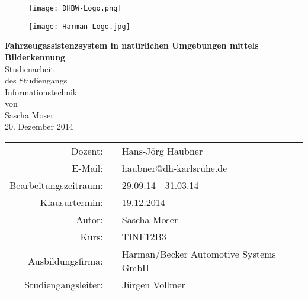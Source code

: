 \begin{titlepage}

  \onehalfspacing
  \begin{figure}[htbp]
    \begin{minipage}{0.4\textwidth}
     \centering
      \texttt{[image: DHBW-Logo.png]}
    \end{minipage}\hfill
    \begin{minipage}{0.4\textwidth}
     \centering
      \texttt{[image: Harman-Logo.jpg]}
    \end{minipage}
  \end{figure}

  \begin{center}	
	\vspace*{2,5cm}
    \huge
	\textbf{Fahrzeugassistenzsystem in natürlichen Umgebungen mittels Bilderkennung\\}
	\vspace*{2cm}
    \Large Studienarbeit\\
    \vspace*{0,5cm}
    \normalsize des Studiengangs\\
    \Large Informationstechnik\\
    \vspace*{0,75cm}
    \normalsize von\\
    \Large Sascha Moser\\
    \vspace*{0,75cm}
    \large 20. Dezember 2014\\
    \vspace*{1,8cm}
    \small
    \renewcommand{\arraystretch}{1,2}
    \singlespacing
    \begin{tabular}{rcl}
    	\hline
  		Dozent: & & Hans-Jörg Haubner\\
  		E-Mail: & & haubner@dh-karlsruhe.de\\
  		Bearbeitungszeitraum: & \hspace*{0,5mm} & 29.09.14 - 31.03.14 \\
  		Klausurtermin: & & 19.12.2014\\
  		Autor: & & Sascha Moser\\
  		Kurs: & & TINF12B3\\
  		Ausbildungsfirma: & & Harman/Becker Automotive Systems GmbH\\
  		Studiengangsleiter: & & Jürgen Vollmer\\
  		\hline
 	\end{tabular}
    
  \end{center}
  \normalsize
  \vfill
  
\end{titlepage}
